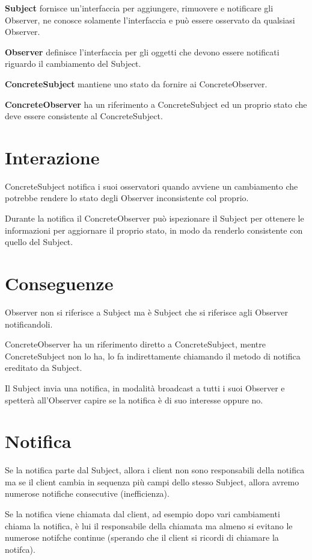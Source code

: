 \textbf{Subject} fornisce un'interfaccia per aggiungere, rimuovere e notificare gli Observer, ne conosce solamente l'interfaccia e può essere osservato da qualsiasi 
Observer.

\textbf{Observer} definisce l'interfaccia per gli oggetti che devono essere notificati riguardo il cambiamento del Subject.

\textbf{ConcreteSubject} mantiene uno stato da fornire ai ConcreteObserver.

\textbf{ConcreteObserver} ha un riferimento a ConcreteSubject ed un proprio stato che deve essere consistente al ConcreteSubject. 

\section{Interazione}

ConcreteSubject notifica i suoi osservatori quando avviene un cambiamento che potrebbe rendere lo stato degli Observer inconsistente col proprio.

Durante la notifica il ConcreteObserver può ispezionare il Subject per ottenere le informazioni per aggiornare il proprio stato, in modo da renderlo consistente con
quello del Subject.

\section{Conseguenze}

Observer non si riferisce a Subject ma è Subject che si riferisce agli Observer notificandoli.

ConcreteObserver ha un riferimento diretto a ConcreteSubject, mentre ConcreteSubject non lo ha, lo fa indirettamente chiamando il metodo di notifica ereditato da Subject.

Il Subject invia una notifica, in modalità broadcast a tutti i suoi Observer e spetterà all'Observer capire se la notifica è di suo interesse oppure no.

\section{Notifica}

Se la notifica parte dal Subject, allora i client non sono responsabili della notifica ma se il client cambia in sequenza più campi dello stesso Subject, allora 
avremo numerose notifiche consecutive (inefficienza).

Se la notifica viene chiamata dal client, ad esempio dopo vari cambiamenti chiama la notifica, è lui il responsabile della chiamata ma almeno si evitano le numerose 
notifche continue (sperando che il client si ricordi di chiamare la notifca).

